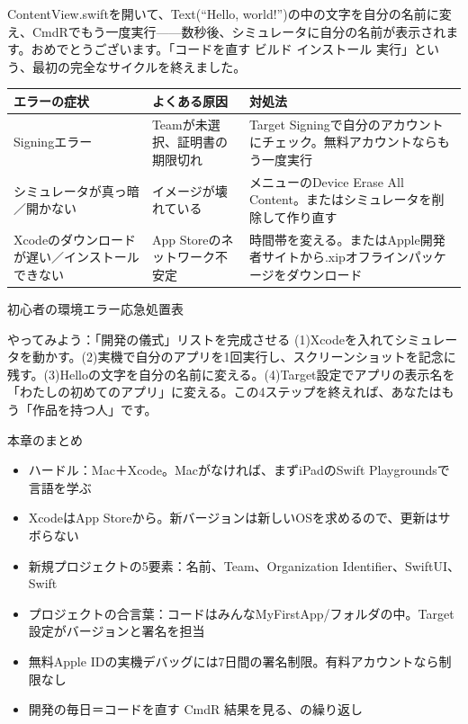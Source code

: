 

ContentView.swiftを開いて、Text(“Hello, world!”)の中の文字を自分の名前に変え、CmdRでもう一度実行——数秒後、シミュレータに自分の名前が表示されます。おめでとうございます。「コードを直す ビルド インストール 実行」という、最初の完全なサイクルを終えました。

\begin{center}
\begin{tabularx}{\linewidth}{|X|X|X|}
\hline
\textbf{エラーの症状} & \textbf{よくある原因} & \textbf{対処法} \tabularnewline
\hline
Signingエラー & Teamが未選択、証明書の期限切れ & Target Signingで自分のアカウントにチェック。無料アカウントならもう一度実行 \tabularnewline
シミュレータが真っ暗／開かない & イメージが壊れている & メニューのDevice Erase All Content。またはシミュレータを削除して作り直す \tabularnewline
Xcodeのダウンロードが遅い／インストールできない & App Storeのネットワーク不安定 & 時間帯を変える。またはApple開発者サイトから.xipオフラインパッケージをダウンロード \tabularnewline
\hline
\end{tabularx}
\end{center}

\begin{center}\small\color{gray}初心者の環境エラー応急処置表\end{center}

\begin{tcbpractice}{やってみよう：「開発の儀式」リストを完成させる}
(1)Xcodeを入れてシミュレータを動かす。(2)実機で自分のアプリを1回実行し、スクリーンショットを記念に残す。(3)Helloの文字を自分の名前に変える。(4)Target設定でアプリの表示名を「わたしの初めてのアプリ」に変える。この4ステップを終えれば、あなたはもう「作品を持つ人」です。

\end{tcbpractice}

\begin{tcbsummary}{本章のまとめ}
\begin{itemize}
  \item ハードル：Mac＋Xcode。Macがなければ、まずiPadのSwift Playgroundsで言語を学ぶ
  \item XcodeはApp Storeから。新バージョンは新しいOSを求めるので、更新はサボらない
  \item 新規プロジェクトの5要素：名前、Team、Organization Identifier、SwiftUI、Swift
  \item プロジェクトの合言葉：コードはみんなMyFirstApp/フォルダの中。Target設定がバージョンと署名を担当
  \item 無料Apple IDの実機デバッグには7日間の署名制限。有料アカウントなら制限なし
  \item 開発の毎日＝コードを直す CmdR 結果を見る、の繰り返し
\end{itemize}

\end{tcbsummary}
